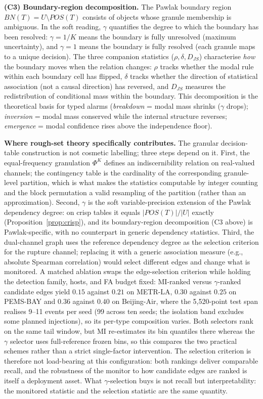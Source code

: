 \documentclass[11pt,a4paper]{article}
\begin{document}
\textbf{(C3) Boundary-region decomposition.} The Pawlak boundary
region $BN(T) = U \setminus POS(T)$ consists of objects whose granule
membership is ambiguous. In the soft reading, $\gamma$ quantifies the
degree to which the boundary has been resolved: $\gamma = 1/K$ means the
boundary is fully unresolved (maximum uncertainty), and $\gamma = 1$ means
the boundary is fully resolved (each granule maps to a unique decision).
The three companion statistics ($\rho, \delta, D_{JS}$) characterise
\emph{how} the boundary moves when the relation changes: $\rho$ tracks
whether the modal rule within each boundary cell has flipped, $\delta$
tracks whether the direction of statistical association (not a causal
direction) has reversed, and $D_{JS}$
measures the redistribution of conditional mass within the boundary.
This decomposition is the theoretical basis for typed alarms
(\emph{breakdown} = modal mass shrinks ($\gamma$ drops); \emph{inversion} =
modal mass conserved while the internal structure reverses; \emph{emergence} =
modal confidence rises above the independence floor).

\textbf{Where rough-set theory specifically contributes.} The granular
decision-table construction is not cosmetic labelling; three steps
depend on it. First, the equal-frequency granulation $\Phi^K$ defines
an indiscernibility relation on real-valued channels; the contingency
table is the cardinality of the corresponding granule-level partition,
which is what makes the statistics computable by integer counting and
the block permutation a valid resampling of the partition (rather than
an approximation). Second, $\gamma$ is the soft variable-precision
extension of the Pawlak dependency degree: on crisp tables it equals
$|POS(T)|/|U|$ exactly (Proposition~\ref{prop:crisp}), and its
boundary-region decomposition (C3 above) is Pawlak-specific, with no
counterpart in generic dependency statistics. Third, the dual-channel
graph uses the reference dependency degree as the selection criterion
for the rupture channel; replacing it with a generic association measure
(e.g., absolute Spearman correlation) would select different edges and
change what is monitored. A matched ablation swaps the edge-selection criterion while holding
the detection family, hosts, and FA budget fixed: MI-ranked versus
$\gamma$-ranked candidate edges yield $0.15$ against $0.21$ on
METR-LA, $0.30$ against $0.25$ on PEMS-BAY and $0.36$ against $0.40$ on
Beijing-Air, where the 5{,}520-point test span realises 9--11 events
per seed (99 across ten seeds; the isolation band excludes some planned
injections), so its per-type composition varies. Both selectors rank on
the same tail window, but MI re-estimates its bin quantiles there whereas
the $\gamma$ selector uses full-reference frozen bins, so this compares
the two practical schemes rather than a strict single-factor intervention.
The selection criterion is therefore not load-bearing at
this configuration: both rankings deliver comparable recall, and the
robustness of the monitor to how candidate edges are ranked is itself
a deployment asset. What $\gamma$-selection buys is not recall but
interpretability: the monitored statistic and the selection statistic
are the same quantity.
\end{document}
